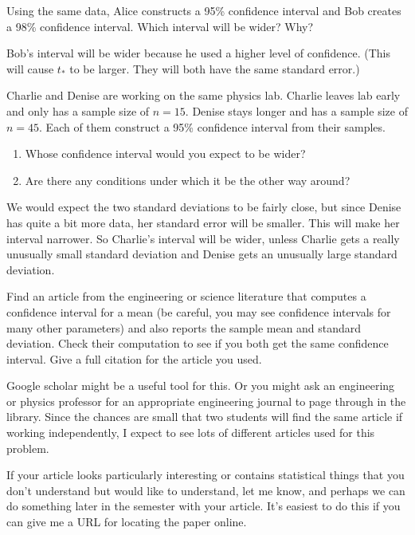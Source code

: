 \documentclass[twoside]{book}\usepackage[]{graphicx}\usepackage[]{xcolor}
\begin{document}
\begin{problem}
	Using the same data, Alice constructs a 95\% confidence interval
	and Bob creates a 98\% confidence interval.  Which interval will be wider?  Why?
\end{problem}

\begin{solution}
	Bob's interval will be wider because he used a higher level of confidence.  (This will
	cause $t_*$ to be larger.  They will both have the same standard error.)
\end{solution}

\begin{problem}
	Charlie and Denise are working on the same physics lab.  Charlie leaves lab early
	and only has a sample size of $n=15$.  Denise stays longer and has a sample
	size of $n=45$.  Each of them construct a 95\% confidence interval from their
	samples.
	\begin{enumerate}
		\item
	Whose confidence interval would you expect to be wider?
\item
  Are there any conditions under which it be the other way around?
	\end{enumerate}
\end{problem}

\begin{solution}
We would expect the two standard deviations to be fairly close, but since Denise 
has quite a bit more data, her standard error will be smaller.  This will make her
interval narrower.  So Charlie's interval will be wider, unless Charlie gets a really unusually 
small standard deviation and Denise gets an unusually large standard deviation.
\end{solution}

\begin{problem}
	Find an article from the engineering or science literature that computes a
	confidence interval for a mean (be careful, you may see confidence intervals
	for many other parameters) and also reports the sample mean and
	standard deviation.  Check their computation to see if you both get the
	same confidence interval.  Give a full citation for the article you used.

	Google scholar might be a useful tool for this.  Or you might ask an
	engineering or physics professor for an appropriate engineering journal to
	page through in the library.  Since the chances are small that two students
	will find the same article if working independently, I expect to see lots
	of different articles used for this problem.

	If your article looks particularly interesting or contains statistical 
	things that you don't understand but would like to understand, let me know,
	and perhaps we can do something later in the semester with your article.
	It's easiest to do this if you can give me a URL for locating the paper online.
\end{problem}
\end{document}
